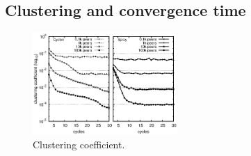 \subsection{Clustering and convergence time}

\begin{figure}
  \centering
  \includegraphics[width=0.49\textwidth]{img/simple.eps}
  \caption{\label{fig:clustering}Clustering coefficient.}
\end{figure}

